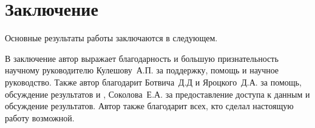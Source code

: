 \chapter*{Заключение}						%


Основные результаты работы заключаются в следующем.


В заключение автор выражает благодарность и большую признательность научному руководителю
Кулешову~А.П. за поддержку, помощь и научное руководство.
Также автор благодарит Ботвича~Д.Д и Яроцкого~Д.А. за
помощь, обсуждение результатов и , Соколова~Е.А. за предоставление
доступа к данным и обсуждение результатов. Автор также благодарит
всех, кто сделал настоящую работу возможной.
